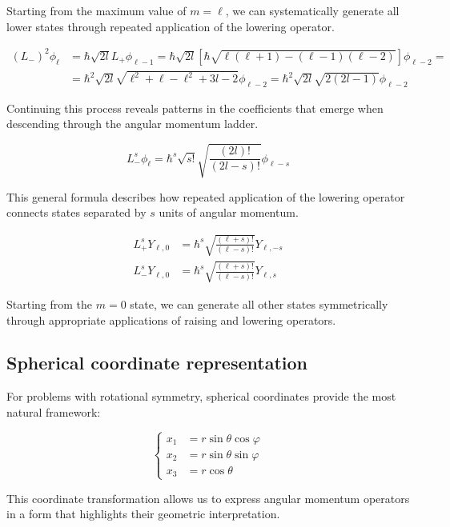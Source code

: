 \documentclass[italian]{HKNdocument}
\begin{document}
Starting from the maximum value of $m=\ell$, we can systematically generate all lower states through repeated application of the lowering operator.

\begin{align}
\left(L_{-}\right)^{2} \phi_{\ell} & =\hbar \sqrt{2 l} L_{+} \phi_{\ell-1}=\hbar \sqrt{2 l}[\hbar \sqrt{\ell(\ell+1)-(\ell-1)(\ell-2)}] \phi_{\ell-2}= \\
& =\hbar^{2} \sqrt{2 l} \sqrt{\ell^{2}+\ell-\ell^{2}+3 l-2} \phi_{\ell-2}=\hbar^{2} \sqrt{2 l} \sqrt{2(2 l-1)} \phi_{\ell-2}
\end{align}

Continuing this process reveals patterns in the coefficients that emerge when descending through the angular momentum ladder.

\begin{equation}
L_{-}^{s} \phi_{\ell}=\hbar^{s} \sqrt{s!} \sqrt{\frac{(2 l)!}{(2 l-s)!}} \phi_{\ell-s}
\end{equation}

This general formula describes how repeated application of the lowering operator connects states separated by $s$ units of angular momentum.

\begin{align}
L_{+}^{s} Y_{\ell, 0} & =\hbar^{s} \sqrt{\frac{(\ell+s)!}{(\ell-s)!}} Y_{\ell,-s} \\
L_{-}^{s} Y_{\ell, 0} & =\hbar^{s} \sqrt{\frac{(\ell+s)!}{(\ell-s)!}} Y_{\ell, s}
\end{align}

Starting from the $m=0$ state, we can generate all other states symmetrically through appropriate applications of raising and lowering operators.

\subsection{Spherical coordinate representation}
For problems with rotational symmetry, spherical coordinates provide the most natural framework:

\[
\begin{cases}x_{1} & =r \sin \theta \cos \varphi  \\ x_{2} & =r \sin \theta \sin \varphi \\ x_{3} & =r \cos \theta\end{cases}
\]

This coordinate transformation allows us to express angular momentum operators in a form that highlights their geometric interpretation.
\end{document}

